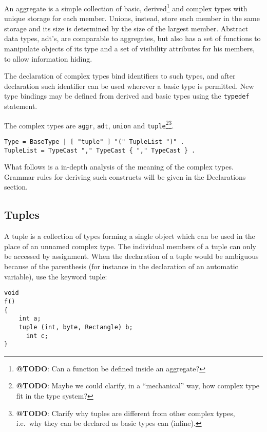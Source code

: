 An aggregate is a simple collection of basic, derived\footnote{\textbf{@TODO}:
  Can a function be defined inside an aggregate?} and complex types with
unique storage for each member. Unions, instead, store each member in
the same storage and its size is determined by the size of the largest
member. Abstract data types, adt's, are comparable to aggregates, but
also has a set of functions to manipulate objects of its type and a set
of visibility attributes for his members, to allow information hiding.

The declaration of complex types bind identifiers to such types, and
after declaration such identifier can be used wherever a basic type is
permitted. New type bindings may be defined from derived and basic types
using the \passthrough{\lstinline!typedef!} statement.

The complex types are \passthrough{\lstinline!aggr!},
\passthrough{\lstinline!adt!}, \passthrough{\lstinline!union!} and
\passthrough{\lstinline!tuple!}\footnote{\textbf{@TODO}: Maybe we could
  clarify, in a ``mechanical'' way, how complex type fit in the type
  system?}\footnote{\textbf{@TODO}: Clarify why tuples are different
  from other complex types, i.e.~why they can be declared as basic types
  can (inline).}.

\begin{lstlisting}
Type = BaseType | [ "tuple" ] "(" TupleList ")" .
TupleList = TypeCast "," TypeCast { "," TypeCast } .
\end{lstlisting}

What follows is a in-depth analysis of the meaning of the complex types.
Grammar rules for deriving such constructs will be given in the
Declarations section.

\hypertarget{tuples}{%
\subsection{Tuples}\label{tuples}}

A tuple is a collection of types forming a single object which can be
used in the place of an unnamed complex type. The individual members of
a tuple can only be accessed by assignment. When the declaration of a
tuple would be ambiguous because of the parenthesis (for instance in the
declaration of an automatic variable), use the keyword tuple:

\begin{lstlisting}
void
f()
{
    int a;
    tuple (int, byte, Rectangle) b;
      int c;
}
\end{lstlisting}

